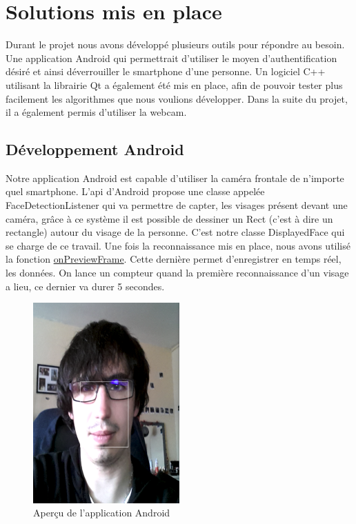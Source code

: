 \section{Solutions mis en place}

Durant le projet nous avons développé plusieurs outils pour répondre au besoin. Une application Android qui permettrait d'utiliser le moyen d'authentification désiré et ainsi déverrouiller le smartphone d'une
personne. Un logiciel C++ utilisant la librairie Qt a également été mis en place, afin de pouvoir tester plus facilement les algorithmes que nous voulions développer. Dans la suite du projet, il a également
permis d'utiliser la webcam.

\subsection{Développement Android}

	Notre application Android est capable d'utiliser la caméra frontale de n'importe quel smartphone. L'api d'Android propose une classe appelée FaceDetectionListener qui va permettre de capter, les visages
présent devant une caméra, grâce à ce système il est possible de dessiner un Rect (c'est à dire un rectangle) autour du visage de la personne. C'est notre classe DisplayedFace qui se charge de ce travail.
Une fois la reconnaissance mis en place, nous avons utilisé la fonction
\href{http://developer.android.com/reference/android/hardware/Camera.PreviewCallback.html#onPreviewFrame\%28byte\%5B\%5D,\%20android.hardware.Camera\%29}{onPreviewFrame}. Cette dernière permet d'enregistrer
en temps réel, les données. On lance un compteur quand la première reconnaissance d'un visage a lieu, ce dernier va durer 5 secondes.\\

\begin{figure}[h!]
	\centering
	\includegraphics[width=0.5\textwidth]{data/appAndroid.png}
	\caption{Aperçu de l'application Android}
\end{figure}

